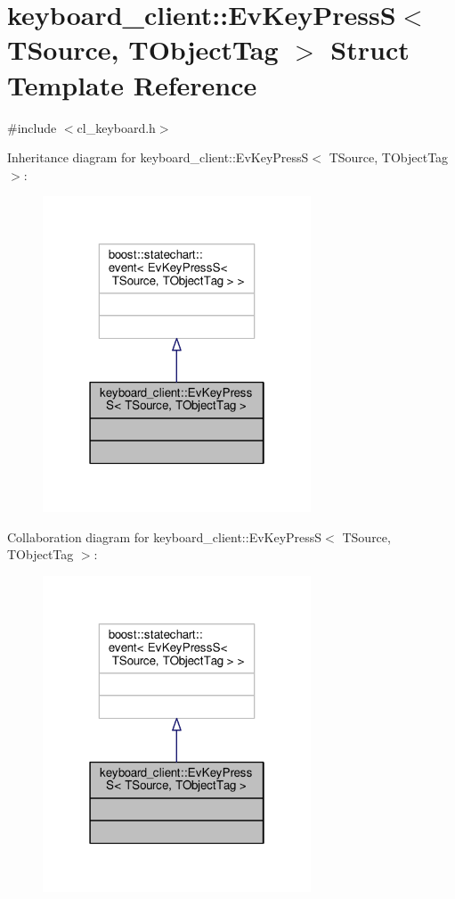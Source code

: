 \hypertarget{structkeyboard__client_1_1EvKeyPressS}{}\section{keyboard\+\_\+client\+:\+:Ev\+Key\+PressS$<$ T\+Source, T\+Object\+Tag $>$ Struct Template Reference}
\label{structkeyboard__client_1_1EvKeyPressS}


{\ttfamily \#include $<$cl\+\_\+keyboard.\+h$>$}



Inheritance diagram for keyboard\+\_\+client\+:\+:Ev\+Key\+PressS$<$ T\+Source, T\+Object\+Tag $>$\+:\nopagebreak
\begin{figure}[H]
\begin{center}
\leavevmode
\includegraphics[width=226pt]{structkeyboard__client_1_1EvKeyPressS__inherit__graph}
\end{center}
\end{figure}


Collaboration diagram for keyboard\+\_\+client\+:\+:Ev\+Key\+PressS$<$ T\+Source, T\+Object\+Tag $>$\+:\nopagebreak
\begin{figure}[H]
\begin{center}
\leavevmode
\includegraphics[width=226pt]{structkeyboard__client_1_1EvKeyPressS__coll__graph}
\end{center}
\end{figure}


